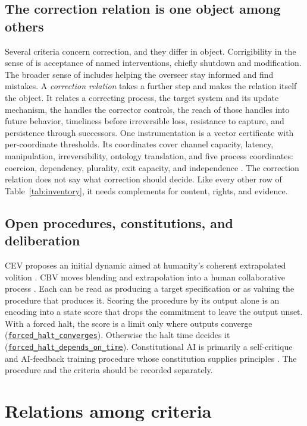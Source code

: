 \documentclass[11pt]{article}
\newcommand{\lean}[1]{\hyperref[lean:#1]{\nolinkurl{#1}}}
\begin{document}
\subsection{The correction relation is one object among others}

Several criteria concern correction, and they differ in object.
Corrigibility in the sense of \textcite{soares2015corrigibility} is acceptance of named interventions, chiefly shutdown and modification.
The broader sense of \textcite{christiano2018corrigibility} includes helping the overseer stay informed and find mistakes.
A \emph{correction relation} takes a further step and makes the relation itself the object.
It relates a correcting process, the target system and its update mechanism, the handles the corrector controls, the reach of those handles into future behavior, timeliness before irreversible loss, resistance to capture, and persistence through successors.
One instrumentation is a vector certificate with per-coordinate thresholds.
Its coordinates cover channel capacity, latency, manipulation, irreversibility, ontology translation, and five process coordinates: coercion, dependency, plurality, exit capacity, and independence \parencite{zarncke2026tsa}.
The correction relation does not say what correction should decide.
Like every other row of Table~\ref{tab:inventory}, it needs complements for content, rights, and evidence.

\subsection{Open procedures, constitutions, and deliberation}

CEV proposes an initial dynamic aimed at humanity's coherent extrapolated volition \parencite{yudkowsky2004cev}.
CBV moves blending and extrapolation into a human collaborative process \parencite{goertzel2012cbv}.
Each can be read as producing a target specification or as valuing the procedure that produces it.
Scoring the procedure by its output alone is an encoding into a state score that drops the commitment to leave the output unset.
With a forced halt, the score is a limit only where outputs converge (\lean{forced_halt_converges}).
Otherwise the halt time decides it (\lean{forced_halt_depends_on_time}).
Constitutional AI is primarily a self-critique and AI-feedback training procedure whose constitution supplies principles \parencite{bai2022constitutional}.
The procedure and the criteria should be recorded separately.

\section{Relations among criteria}
\label{sec:relations}
\end{document}
